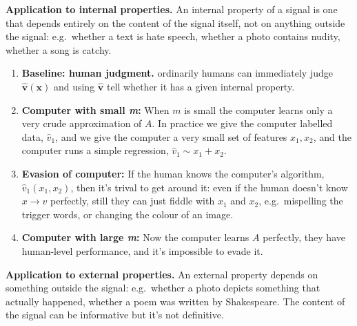 \documentclass[
  10pt,
  letterpaper,
  DIV=11,
  numbers=noendperiod,
  oneside]{scrartcl}
\providecommand{\tightlist}{%
  \setlength{\itemsep}{0pt}\setlength{\parskip}{0pt}}\usepackage{longtable,booktabs,array}
\newcommand{\bm}[1]{\boldsymbol{#1}}
\begin{document}
\textbf{Application to internal properties.} An internal property of a
signal is one that depends entirely on the content of the signal itself,
not on anything outside the signal: e.g.~whether a text is hate speech,
whether a photo contains nudity, whether a song is catchy.

\begin{enumerate}
\def\labelenumi{\arabic{enumi}.}
\tightlist
\item
  \textbf{Baseline: human judgment.} ordinarily humans can immediately
  judge \(\hat{\bm{v}}(\bm{x})\) and using \(\hat{\bm{v}}\) tell whether
  it has a given internal property.
\item
  \textbf{Computer with small \emph{m}:} When \(m\) is small the
  computer learns only a very crude approximation of \(A\). In practice
  we give the computer labelled data, \(\hat{v}_1\), and we give the
  computer a very small set of features \(x_1,x_2\), and the computer
  runs a simple regression, \(\hat{v}_1\sim x_1+x_2\).
\item
  \textbf{Evasion of computer:} If the human knows the computer's
  algorithm, \(\hat{v}_1(x_1,x_2)\), then it's trival to get around it:
  even if the human doesn't know \(x\rightarrow v\) perfectly, still
  they can just fiddle with \(x_1\) and \(x_2\), e.g.~mispelling the
  trigger words, or changing the colour of an image.
\item
  \textbf{Computer with large \emph{m}:} Now the computer learns \(A\)
  perfectly, they have human-level performance, and it's impossible to
  evade it.
\end{enumerate}

\textbf{Application to external properties.} An external property
depends on something outside the signal: e.g.~whether a photo depicts
something that actually happened, whether a poem was written by
Shakespeare. The content of the signal can be informative but it's not
definitive.
\end{document}
